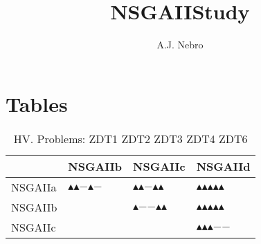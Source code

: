 \documentclass{article}
\title{NSGAIIStudy}
\author{A.J. Nebro}
\begin{document}
\maketitle
\section{Tables}

\begin{table}
\caption{HV. Problems: ZDT1 ZDT2 ZDT3 ZDT4 ZDT6 }
\label{table: HV}
\centering
\begin{scriptsize}
\begin{tabular}{llll}
\hline 
 &  NSGAIIb &  NSGAIIc &  NSGAIId\\
\hline 
 NSGAIIa & $\blacktriangle$$\blacktriangle$$-$$\blacktriangle$$-$ & $\blacktriangle$$\blacktriangle$$-$$\blacktriangle$$\blacktriangle$ & $\blacktriangle$$\blacktriangle$$\blacktriangle$$\blacktriangle$$\blacktriangle$\\
 NSGAIIb &  & $\blacktriangle$$-$$-$$\blacktriangle$$\blacktriangle$ & $\blacktriangle$$\blacktriangle$$\blacktriangle$$\blacktriangle$$\blacktriangle$\\
 NSGAIIc &  &  & $\blacktriangle$$\blacktriangle$$\blacktriangle$$-$$-$\\
\hline
\end{tabular}
\end{scriptsize}
\end{table}
\end{document}
